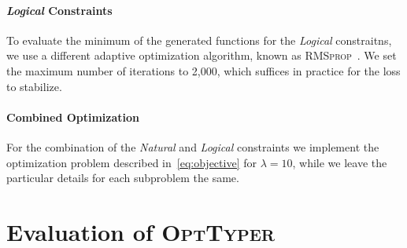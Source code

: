 \documentclass[sigplan,10pt,review,anonymous]{acmart} %
\newcommand{\projectname}{\textsc{OptTyper}\xspace}
\theoremstyle{plain}
\theoremstyle{remark}
\theoremstyle{definition}
\begin{document}
%     

\paragraph{\textit{Logical} Constraints} To evaluate the minimum of the generated functions for the \textit{Logical} constraitns, we use a different adaptive optimization algorithm,
known as \textsc{RMSprop}~\cite{tieleman2014}.
We set the maximum number of iterations to 2,000, which suffices in practice for the loss to stabilize.

\paragraph{Combined Optimization} For the combination of the \textit{Natural} and \textit{Logical} constraints we implement the optimization problem described in~\eqref{eq:objective} for $\lambda = 10$, while we leave the particular details for each subproblem the same. 
\section{Evaluation of \projectname{}}\label{sec:eval}
\end{document}
